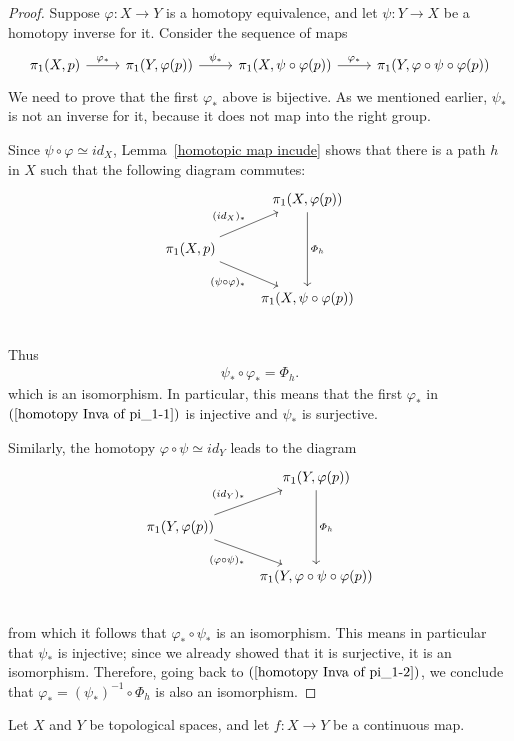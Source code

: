 \begin{proof}
Suppose $\varphi:X\to Y$ is a homotopy equivalence, and let $\psi:Y\to X$ be a homotopy inverse for it. Consider the sequence of maps
\begin{equation}\label{homotopy Inva of pi_1-1}
\begin{tikzcd}\pi_1(X,p)\ar[r,"\varphi_*"]&\pi_1(Y,\varphi(p))\ar[r,"\psi_*"]&\pi_1(X,\psi\circ\varphi(p))\ar[r,"\varphi_*"]&\pi_1(Y,\varphi\circ\psi\circ\varphi(p))
\end{tikzcd}
\end{equation}
We need to prove that the first $\varphi_*$ above is bijective. As we mentioned earlier, $\psi_*$ is not an inverse for it, because it does not map into the right group.\par
Since $\psi\circ\varphi\simeq id_X$, Lemma~\ref{homotopic map incude} shows that there is a path $h$ in $X$ such that the following diagram commutes:
\[\begin{tikzcd}
&\pi_1(X,\varphi(p))\ar[dd,"\varPhi_h"]\\
\pi_1(X,p)\ar[ru,"(id_X)_*"]\ar[rd,swap,"(\psi\circ\varphi)_*"]&\\
&\pi_1(X,\psi\circ\varphi(p))\\
\end{tikzcd}\]
Thus
\begin{align}\label{homotopy Inva of pi_1-2}
\psi_*\circ\varphi_*=\varPhi_h.
\end{align}
which is an isomorphism. In particular, this means that the first $\varphi_*$ in $(\ref{homotopy Inva of pi_1-1})$ is injective and $\psi_*$ is surjective.\par
Similarly, the homotopy $\varphi\circ\psi\simeq id_Y$ leads to the diagram
\[\begin{tikzcd}
&\pi_1(Y,\varphi(p))\ar[dd,"\varPhi_h"]\\
\pi_1(Y,\varphi(p))\ar[ru,"(id_Y)_*"]\ar[rd,swap,"(\varphi\circ\psi)_*"]&\\
&\pi_1(Y,\varphi\circ\psi\circ\varphi(p))\\
\end{tikzcd}\]
from which it follows that $\varphi_*\circ\psi_*$ is an isomorphism. This means in particular that $\psi_*$ is injective; since we already showed that it
is surjective, it is an isomorphism. Therefore, going back to $(\ref{homotopy Inva of pi_1-2})$, we conclude that $\varphi_*=(\psi_*)^{-1}\circ\varPhi_h$ is also an isomorphism.
\end{proof}
Let $X$ and $Y$ be topological spaces, and let $f:X\to Y$ be a continuous map.
